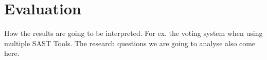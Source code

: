 \section{Evaluation}
\label{sec:eval}
How the results are going to be interpreted. 
For ex. the voting system when using multiple SAST Tools.
The research questions we are going to analyse also come here.